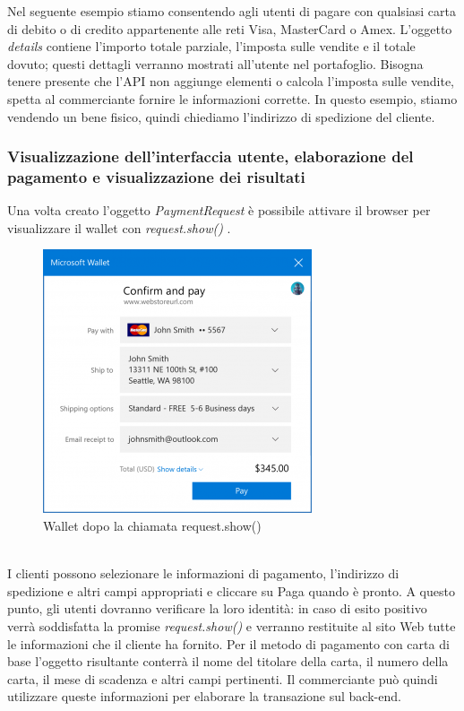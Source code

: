 \documentclass[11pt ,a4paper , twoside , openright ]{book}
\begin{document}
	Nel seguente esempio stiamo consentendo agli utenti di pagare con qualsiasi carta di debito o di credito appartenente alle reti Visa, MasterCard o Amex. L'oggetto \textit{details} contiene l'importo totale parziale, l'imposta sulle vendite e il totale dovuto; questi dettagli verranno mostrati all'utente nel portafoglio. Bisogna tenere presente che l'API non aggiunge elementi o calcola l'imposta sulle vendite, spetta al commerciante fornire le informazioni corrette. In questo esempio, stiamo vendendo un bene fisico, quindi chiediamo l'indirizzo di spedizione del cliente.
	
	\subsubsection{Visualizzazione dell'interfaccia utente, elaborazione del pagamento e visualizzazione dei risultati}
	Una volta creato l'oggetto \textit{PaymentRequest} è possibile attivare il browser per visualizzare il wallet con \textit{request.show()} \cite{rif12}. 
	\begin{figure}[h]
		\centering
		\includegraphics[width=0.5\linewidth]{wallet1}
		\caption{Wallet dopo la chiamata request.show()}
		\label{fig: Wallet dopo la chiamata request.show()}
	\end{figure}
	\\
	\pagebreak
	I clienti possono  selezionare le informazioni di pagamento, l'indirizzo di spedizione e altri campi appropriati e cliccare su Paga quando è pronto. A questo punto, gli utenti dovranno verificare la loro identità: in caso di esito positivo verrà soddisfatta la promise \textit{request.show()} e verranno restituite al sito Web tutte le informazioni che il cliente ha fornito. Per il metodo di pagamento con carta di base l'oggetto risultante conterrà il nome del titolare della carta, il numero della carta, il mese di scadenza e altri campi pertinenti. Il commerciante può quindi utilizzare queste informazioni per elaborare la transazione sul back-end.
\end{document}
